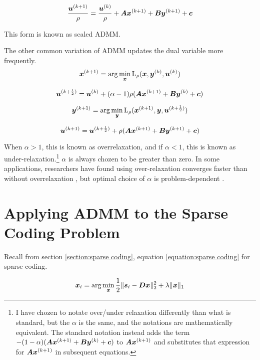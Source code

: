 \begin{equation}
\frac{\bm{u}^{(k + 1)}}{\rho} = \frac{\bm{u}^{(k)}}{\rho} + \bm{A}\bm{x}^{(k + 1)} + \bm{B}\bm{y}^{(k + 1)} + \bm{c}
\end{equation}

This form is known as scaled ADMM.

The other common variation of ADMM updates the dual variable more frequently.
\begin{equation}
\bm{x}^{(k + 1)} = \arg\min_{\bm{x}} \operatorname{L}_{\rho}(\bm{x},\bm{y}^{(k)},\bm{u}^{(k)})
\end{equation}

\begin{equation}
\bm{u}^{(k + \frac{1}{2})} = \bm{u}^{(k)} + (\alpha - 1)\rho(\bm{A}\bm{x}^{(k + 1)} + \bm{B}\bm{y}^{(k)} + \bm{c})
\end{equation}

\begin{equation}
\bm{y}^{(k + 1)} = \arg\min_{\bm{y}} \operatorname{L}_{\rho}(\bm{x}^{(k + 1)},\bm{y},\bm{u}^{(k + \frac{1}{2})})
\end{equation}

\begin{equation}
\bm{u}^{(k + 1)} = \bm{u}^{(k + \frac{1}{2})} + \rho(\bm{A}\bm{x}^{(k + 1)} + \bm{B}\bm{y}^{(k + 1)} + \bm{c})
\end{equation}

When $\alpha > 1$, this is known as overrelaxation, and if $\alpha < 1$, this is known as under-relaxation.\footnote{I have chozen to notate over/under relaxation differently than what is standard, but the $\alpha$ is the same, and the notations are mathematically equivalent. The standard notation instead adds the term $-(1 - \alpha)(\bm{A}\bm{x}^{(k + 1)} + \bm{B}\bm{y}^{(k)} + \bm{c})$ to $\bm{A}\bm{x}^{(k + 1)}$ and substitutes that expression for $\bm{A}\bm{x}^{(k + 1)}$ in subsequent equations.} $\alpha$ is always chozen to be greater than zero. In some applications, researchers have found using over-relaxation converges faster than without overrelaxation \cite{eckstein1994parallel}, but optimal choice of $\alpha$ is problem-dependent \cite{nishihara2015general}.


\section{Applying ADMM to the Sparse Coding Problem}
\label{section:Applying ADMM}
Recall from section \ref{section:sparse coding}, equation \ref{equation:sparse coding} for sparse coding.

\begin{equation}
\bm{x}_i = \arg\min_{\bm{x}} \frac{1}{2}\|\bm{s}_i - \bm{D}\bm{x}\|_2^2 + \lambda \|\bm{x}\|_1
\end{equation}

